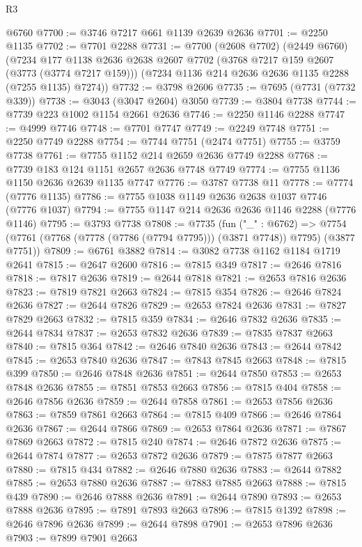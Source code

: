 \begin{lexlean}{R3}
\begin{coremodule}
    @6760
@7700 := @3746 @7217 @661 @1139 @2639 @2636
@7701 := @2250 @1135
@7702 := @7701 @2288
@7731 := @7700
    (@2608 @7702)
    (@2449 @6760)
    (@7234
      @177
      @1138
      @2636
      @2638
      @2607
      @7702
      (@3768 @7217 @159 @2607 (@3773 (@3774 @7217 @159)))
      (@7234 @1136 @214 @2636 @2636 @1135 @2288 (@7255 @1135) @7274))
@7732 := @3798 @2606
@7735 := @7695 (@7731 (@7732 @339))
@7738 := @3043 (@3047 @2604) @3050
@7739 := @3804 @7738
@7744 := @7739 @223 @1002 @1154 @2661 @2636
@7746 := @2250 @1146 @2288
@7747 := @4999 @7746
@7748 := @7701 @7747
@7749 := @2249 @7748
@7751 := @2250 @7749 @2288
@7754 := @7744 @7751 (@2474 @7751)
@7755 := @3759 @7738
@7761 := @7755 @1152 @214 @2659 @2636 @7749 @2288
@7768 := @7739 @183 @124 @1151 @2657 @2636 @7748 @7749
@7774 := @7755 @1136 @1150 @2636 @2639 @1135 @7747
@7776 := @3787 @7738 @11
@7778 := @7774 (@7776 @1135)
@7786 := @7755 @1038 @1149 @2636 @2638 @1037 @7746 (@7776 @1037)
@7794 := @7755 @1147 @214 @2636 @2636 @1146 @2288 (@7776 @1146)
@7795 := @3793 @7738
@7808 := @7735
    (fun ("_" : @6762) =>
    @7754 (@7761 (@7768 (@7778 (@7786 (@7794 @7795))) (@3871 @7748)) @7795) (@3877 @7751))
@7809 := @6761 @3882
@7814 := @3082 @7738 @1162 @1184 @1719 @2641
@7815 := @2647 @2600
@7816 := @7815 @349
@7817 := @2646 @7816
@7818 := @7817 @2636
@7819 := @2644 @7818
@7821 := @2653 @7816 @2636
@7823 := @7819 @7821 @2663
@7824 := @7815 @354
@7826 := @2646 @7824 @2636
@7827 := @2644 @7826
@7829 := @2653 @7824 @2636
@7831 := @7827 @7829 @2663
@7832 := @7815 @359
@7834 := @2646 @7832 @2636
@7835 := @2644 @7834
@7837 := @2653 @7832 @2636
@7839 := @7835 @7837 @2663
@7840 := @7815 @364
@7842 := @2646 @7840 @2636
@7843 := @2644 @7842
@7845 := @2653 @7840 @2636
@7847 := @7843 @7845 @2663
@7848 := @7815 @399
@7850 := @2646 @7848 @2636
@7851 := @2644 @7850
@7853 := @2653 @7848 @2636
@7855 := @7851 @7853 @2663
@7856 := @7815 @404
@7858 := @2646 @7856 @2636
@7859 := @2644 @7858
@7861 := @2653 @7856 @2636
@7863 := @7859 @7861 @2663
@7864 := @7815 @409
@7866 := @2646 @7864 @2636
@7867 := @2644 @7866
@7869 := @2653 @7864 @2636
@7871 := @7867 @7869 @2663
@7872 := @7815 @240
@7874 := @2646 @7872 @2636
@7875 := @2644 @7874
@7877 := @2653 @7872 @2636
@7879 := @7875 @7877 @2663
@7880 := @7815 @434
@7882 := @2646 @7880 @2636
@7883 := @2644 @7882
@7885 := @2653 @7880 @2636
@7887 := @7883 @7885 @2663
@7888 := @7815 @439
@7890 := @2646 @7888 @2636
@7891 := @2644 @7890
@7893 := @2653 @7888 @2636
@7895 := @7891 @7893 @2663
@7896 := @7815 @1392
@7898 := @2646 @7896 @2636
@7899 := @2644 @7898
@7901 := @2653 @7896 @2636
@7903 := @7899 @7901 @2663

\end{coremodule}
\end{lexlean}
